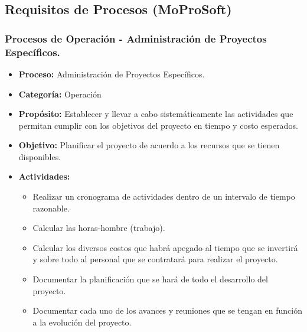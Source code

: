 \subsection{Requisitos de Procesos (MoProSoft)}
\subsubsection{Procesos de Operación - Administración de Proyectos Específicos.}
\begin{itemize}
	\item \textbf{Proceso:} Administración de Proyectos Específicos.
	\item \textbf{Categoría:} Operación
	\item \textbf{Propósito:} Establecer y llevar a cabo sistemáticamente las actividades que permitan cumplir con los objetivos del proyecto en tiempo y costo esperados.  
	\item \textbf{Objetivo:} Planificar el proyecto de acuerdo a los recursos que se tienen disponibles. 
	\item \textbf{Actividades:}
	\begin{itemize}
		\item Realizar un cronograma de actividades dentro de un intervalo de tiempo razonable.
		\item Calcular las horas-hombre (trabajo).
		\item Calcular los diversos costos que habrá apegado al tiempo que se invertirá y sobre todo al personal que se contratará para realizar el proyecto. 
		\item Documentar la planificación que se hará de todo el desarrollo del proyecto.
		\item Documentar cada uno de los avances y reuniones que se tengan en función a la evolución del proyecto.
	\end{itemize} 
\end{itemize}
